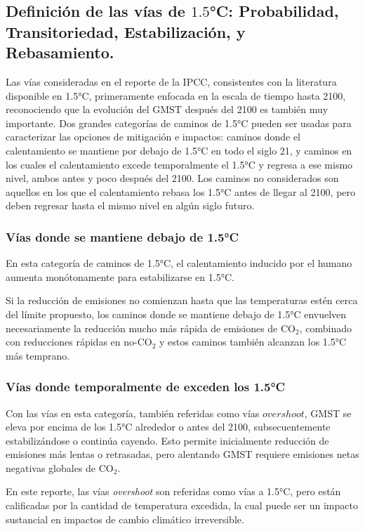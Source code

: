 \documentclass{article}
\begin{document}
\subsection{Definición de las vías de $1.5$°C: Probabilidad, Transitoriedad, Estabilización, y Rebasamiento.}

Las vías consideradas en el reporte de la IPCC, consistentes con la literatura disponible en 1.5°C, primeramente enfocada en la escala de tiempo hasta 2100, reconociendo que la evolución del GMST después del 2100 es también muy importante. Dos grandes categorías de caminos de 1.5°C pueden ser usadas para caracterizar las opciones de mitigación e impactos: caminos donde el calentamiento se mantiene por debajo de 1.5°C en todo el siglo 21, y caminos en los cuales el calentamiento excede temporalmente el 1.5°C y regresa a ese mismo nivel, ambos antes y poco después del 2100. Los caminos no considerados son aquellos en los que el calentamiento rebasa los 1.5°C antes de llegar al 2100, pero deben regresar hasta el mismo nivel en algún siglo futuro.

\subsubsection{Vías donde se mantiene debajo de 1.5°C}

En esta categoría de caminos de 1.5°C, el calentamiento inducido por el humano aumenta monótonamente para estabilizarse en 1.5°C.

Si la reducción de emisiones no comienzan hasta que las temperaturas estén cerca del límite propuesto, los caminos donde se mantiene debajo de 1.5°C envuelven necesariamente la reducción mucho más rápida de emisiones de CO$_2$, combinado con reducciones rápidas en no-CO$_2$ y estos caminos también alcanzan los 1.5°C más temprano.

\subsubsection{Vías donde temporalmente de exceden los 1.5°C}

Con las vías en esta categoría, también referidas como vías \(overshoot\), GMST se eleva por encima de los 1.5°C alrededor o antes del 2100, subsecuentemente estabilizándose o continúa cayendo. Esto permite inicialmente reducción de emisiones más lentas o retrasadas, pero alentando GMST requiere emisiones netas negativas globales de CO$_2$.

En este reporte, las vías \textit{overshoot} son referidas como vías a 1.5°C, pero están calificadas por la cantidad de temperatura excedida, la cual puede ser un impacto sustancial en impactos de cambio climático irreversible.
\end{document}
